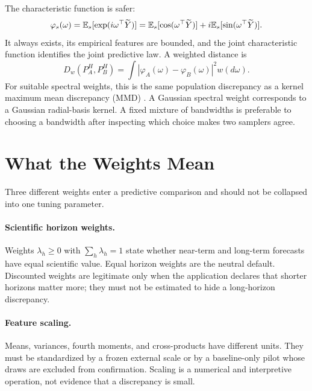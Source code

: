 The characteristic function is safer:
\begin{equation}
  \varphi_s(\omega)
  =\mathbb{E}_s[\exp(i\omega^\top\widetilde Y)]
  =\mathbb{E}_s[\cos(\omega^\top\widetilde Y)]
   +i\mathbb{E}_s[\sin(\omega^\top\widetilde Y)].
  \label{eq:bf-ssl-lstm-characteristic-function}
\end{equation}
It always exists, its empirical features are bounded, and the joint
characteristic function identifies the joint predictive law.  A weighted
distance is
\begin{equation}
  D_w(P_A^H,P_B^H)
  =\int
    \left|\varphi_A(\omega)-\varphi_B(\omega)\right|^2
    w(d\omega).
  \label{eq:bf-ssl-lstm-weighted-cf-distance}
\end{equation}
For suitable spectral weights, this is the same population discrepancy as a
kernel maximum mean discrepancy (MMD) \citep{gretton2012kernel,
sriperumbudur2010hilbert}.  A Gaussian spectral weight corresponds to a
Gaussian radial-basis kernel.  A fixed mixture of bandwidths is preferable to
choosing a bandwidth after inspecting which choice makes two samplers agree.

\section{What the Weights Mean}
\label{sec:bf-ssl-lstm-predictive-weights}

Three different weights enter a predictive comparison and should not be
collapsed into one tuning parameter.

\paragraph{Scientific horizon weights.}
Weights $\lambda_h\geq0$ with $\sum_h\lambda_h=1$ state whether near-term and
long-term forecasts have equal scientific value.  Equal horizon weights are
the neutral default.  Discounted weights are legitimate only when the
application declares that shorter horizons matter more; they must not be
estimated to hide a long-horizon discrepancy.

\paragraph{Feature scaling.}
Means, variances, fourth moments, and cross-products have different units.
They must be standardized by a frozen external scale or by a baseline-only
pilot whose draws are excluded from confirmation.  Scaling is a numerical and
interpretive operation, not evidence that a discrepancy is small.

